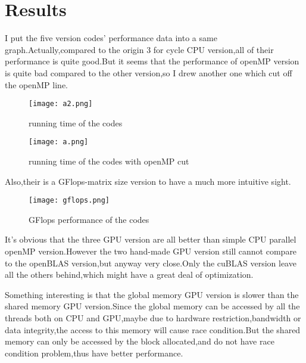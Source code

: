 \documentclass[11pt]{scrartcl} %
\begin{document}
\section{Results}
I put the five version codes' performance data into a same graph.Actually,compared to the origin 3 for cycle CPU version,all of their performance is quite good.But it seems that the performance of openMP version is quite bad compared to the other version,so I drew another one which cut off the openMP line.
\begin{figure}[H]
	\centering
	\texttt{[image: a2.png]}
	\caption{running time of the codes}
	\label{}
\end{figure}
\begin{figure}[H]
	\centering
	\texttt{[image: a.png]}
	\caption{running time of the codes with openMP cut}
	\label{}
\end{figure}
Also,their is a GFlops-matrix size version to have a much more intuitive sight.
\begin{figure}[H]
	\centering
	\texttt{[image: gflops.png]}
	\caption{GFlops performance of the codes}
	\label{}
\end{figure}
It's obvious that the three GPU version are all better than simple CPU parallel openMP version.However the two hand-made GPU version still cannot compare to the openBLAS version,but anyway very close.Only the cuBLAS version leave all the others behind,which might have a great deal of optimization.

Something interesting is that the global memory GPU version is slower than the shared memory GPU version.Since the global memory can be accessed by all the threads both on CPU and GPU,maybe due to hardware restriction,bandwidth or data integrity,the access to this memory will cause race condition.But the shared memory can only be accessed by the block allocated,and do not have race condition problem,thus have better performance.
\end{document}
